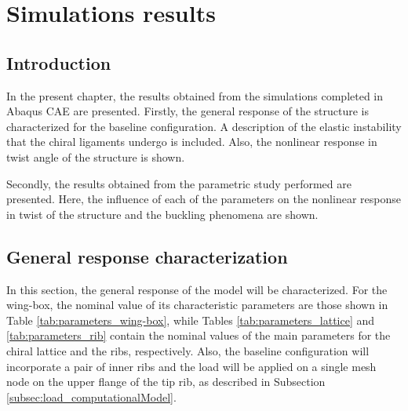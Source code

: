 \chapter{Simulations results} \label{chap:results_sim}

\section{Introduction} \label{sec:intro_results_sim}

  In the present chapter, the results obtained from the simulations completed in Abaqus CAE are presented. Firstly, the general response of the structure is characterized for the baseline configuration. A description of the elastic instability that the chiral ligaments undergo is included. Also, the nonlinear response in twist angle of the structure is shown.

  Secondly, the results obtained from the parametric study performed are presented. Here, the influence of each of the parameters on the nonlinear response in twist of the structure and the buckling phenomena are shown.

\section{General response characterization} \label{sec:generalResponseCharact_results_sim}

  In this section, the general response of the model will be characterized. For the wing-box, the nominal value of its characteristic parameters are those shown in Table \ref{tab:parameters_wing-box}, while Tables \ref{tab:parameters_lattice} and \ref{tab:parameters_rib} contain the nominal values of the main parameters for the chiral lattice and the ribs, respectively. Also, the baseline configuration will incorporate a pair of inner ribs and the load will be applied on a single mesh node on the upper flange of the tip rib, as described in Subsection \ref{subsec:load_computationalModel}.

